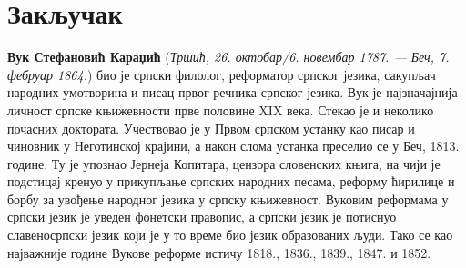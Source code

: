 \documentclass[12pt,oneside]{memoir}
\begin{document}
\pangrami

\pangrami

\chapter{Закључак}
\pangrami

\pangrami

\literatura

\backmatter

\begin{biografija}
\textbf{Вук Стефановић Караџић} (\emph{Тршић, 26. октобар/6. новембар
  1787. — Беч, 7. фебруар 1864.}) био је српски филолог, реформатор
српског језика, сакупљач народних умотворина и писац првог речника
српског језика.  Вук је најзначајнија личност српске књижевности прве
половине XIX века. Стекао је и неколико почасних доктората.
Учествовао је у Првом српском устанку као писар и чиновник у
Неготинској крајини, а након слома устанка преселио се у Беч,
1813. године. Ту је упознао Јернеја Копитара, цензора словенских
књига, на чији је подстицај кренуо у прикупљање српских народних
песама, реформу ћирилице и борбу за увођење народног језика у српску
књижевност. Вуковим реформама у српски језик је уведен фонетски
правопис, а српски језик је потиснуо славеносрпски језик који је у то
време био језик образованих људи. Тако се као најважније године Вукове
реформе истичу 1818., 1836., 1839., 1847. и 1852.
\end{biografija}
\end{document}
